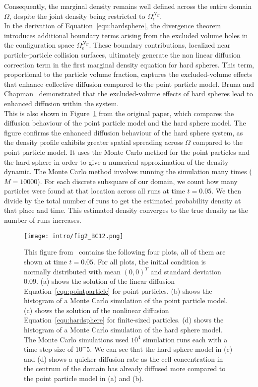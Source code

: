 Consequently, the marginal density remains well defined across the entire domain $\Omega$, despite the joint density being restricted to $\Omega_{\epsilon}^{N_C}$. \\
In the derivation of Equation~\eqref{equ:hardsphere}, the divergence theorem introduces additional boundary terms arising from the excluded volume holes in the configuration space $\Omega_{\epsilon}^{N_C}$. 
These boundary contributions, localized near particle-particle collision surfaces, ultimately generate the non linear diffusion correction term in the first marginal density equation for hard spheres. 
This term, proportional to the particle volume fraction, captures the excluded-volume effects that enhance collective diffusion compared to the point particle model. 
Bruna and Chapman~\cite{Bruna2012} demonstrated that the excluded-volume effects of hard spheres lead to enhanced diffusion within the system. \\
This is also shown in Figure~\ref{fig:fig2BC12} from the original paper, which compares the diffusion behaviour of the point particle model and the hard sphere model. 
The figure confirms the enhanced diffusion behaviour of the hard sphere system, as the density profile exhibits greater spatial spreading across $\Omega$ compared to the point particle model. 
It uses the Monte Carlo method for the point particles and the hard sphere in order to give a numerical approximation of the density dynamic. 
The Monte Carlo method involves running the simulation many times ($M=10000$). 
For each discrete subsquare of our domain, we count how many particles were found at that location across all runs at time $t=0.05$. 
We then divide by the total number of runs to get the estimated probability density at that place and time. 
This estimated density converges to the true density as the number of runs increases. \\

\begin{figure}[h!]
	\centering
    \texttt{[image: intro/fig2\_BC12.png]}
    \caption{
    This figure from~\cite{Bruna2012} contains the following four plots, all of them are shown at time \( t=0.05 \). 
	For all plots, the initial condition is normally distributed with mean $(0,0)^T$ and standard deviation $0.09$. 
    (a) shows the solution of the linear diffusion Equation~\eqref{equ:pointparticle} for point particles. 
    (b) shows the histogram of a Monte Carlo simulation of the point particle model. 
    (c) shows the solution of the nonlinear diffusion Equation~\eqref{equ:hardsphere} for finite-sized particles. 
    (d) shows the histogram of a Monte Carlo simulation of the hard sphere model. 
    The Monte Carlo simulations used $10^4$ simulation runs each with a time step size of $10^-5$.
	We can see that the hard sphere model in (c) and (d) shows a quicker diffusion rate as the cell concentration in the centrum of the domain has already diffused more compared to the point particle model in (a) and (b). 
    }
    \label{fig:fig2BC12}
\end{figure}



